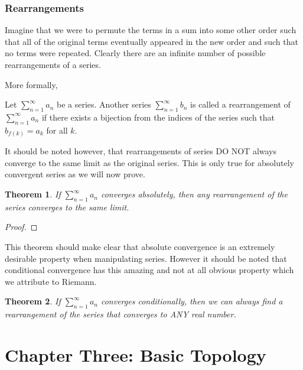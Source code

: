 \documentclass{tufte-book}
\newtheorem{theorem}{Theorem}[chapter]
\theoremstyle{definition}
\numberwithin{section}{chapter}
\begin{document}
	
	\subsection{Rearrangements}
		Imagine that we were to permute the terms in a sum into some other order such that all of the original terms eventually appeared in the new order and such that no terms were repeated.  Clearly there are an infinite number of possible rearrangements of a series.  
		
		More formally,
		
		  Let  $\sum_{n=1}^{\infty} a_n$ be a series.  Another series  $\sum_{n=1}^{\infty} b_n$ is called a rearrangement of  $\sum_{n=1}^{\infty} a_n$ if there exists a bijection from the indices of the series such that $b_{f(k)} = a_{k}$ for all $k$.
		
		It should be noted however, that rearrangements of series DO NOT always converge to the same limit as the original series.  This is only true for absolutely convergent series as we will now prove.
		
		
		\begin{theorem}
	If $\sum_{n=1}^{\infty} a_n$ converges absolutely, then any rearrangement of the series converges to the same limit.
	\end{theorem} 
	\begin{proof}  \end{proof}
	
	This theorem should make clear that absolute convergence is an extremely desirable property when manipulating series.  However it should be noted that conditional convergence has this amazing and not at all obvious property which we attribute to Riemann.
	
	
	\begin{theorem}
	If $\sum_{n=1}^{\infty} a_n$ converges conditionally, then we can always find a  rearrangement of the series that converges to ANY real number.
	\end{theorem} 
		
		
\setcounter{chapter}{3}
\chapter{Chapter Three:  Basic Topology}


\setcounter{section}{0}
\setcounter{theorem}{0}
\setcounter{definition}{0}		
		
\end{document}
